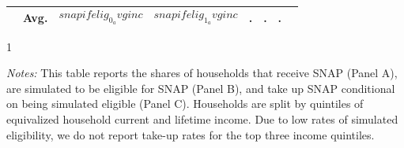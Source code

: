 \begin{table}[t]
\begin{tabular*}{\textwidth}{@{\extracolsep{\fill}}llcccccc@{}}
                                       & Avg. & $$snapifelig_0_avginc$$ & $$snapifelig_1_avginc$$ & . & . & . &   \\                                      \bottomrule
\end{tabular*}
            \begin{spacing}{1}
\begin{tablenotes}
       \item \footnotesize \textit{Notes:} This table reports the shares of households that receive SNAP (Panel A), are simulated to be eligible for SNAP (Panel B), and take up SNAP conditional on being simulated eligible (Panel C). Households are split by quintiles of equivalized household current and lifetime income.  Due to low rates of simulated eligibility, we do not report take-up rates for the top three income quintiles.
      \end{tablenotes}
       \end{spacing}
\end{table}
    
    
    